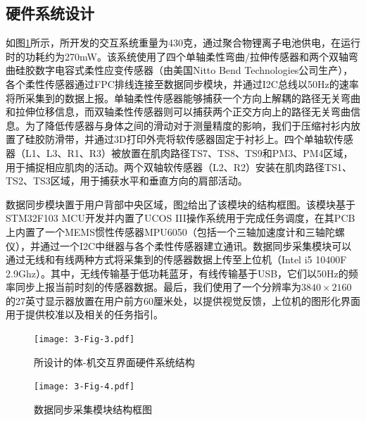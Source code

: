 \subsection{硬件系统设计}如图\ref{3-fig-3}所示，所开发的交互系统重量为430克，通过聚合物锂离子电池供电，在运行时的功耗约为270mW。该系统使用了四个单轴柔性弯曲/拉伸传感器和两个双轴弯曲硅胶数字电容式柔性应变传感器（由美国Nitto Bend Technologies公司生产），各个柔性传感器通过FPC排线连接至数据同步模块，并通过I2C总线以50Hz的速率将所采集到的数据上报。单轴柔性传感器能够捕获一个方向上解耦的路径无关弯曲和拉伸位移信息，而双轴柔性传感器则可以捕获两个正交方向上的路径无关弯曲信息。为了降低传感器与身体之间的滑动对于测量精度的影响，我们于压缩衬衫内放置了硅胶防滑带，并通过3D打印外壳将软传感器固定于衬衫上。四个单轴软传感器（L1、L3、R1、R3）被放置在肌肉路径TS7、TS8、TS9和PM3、PM4区域，用于捕捉相应肌肉的活动。两个双轴软传感器（L2、R2）安装在肌肉路径TS1、TS2、TS3区域，用于捕获水平和垂直方向的肩部活动。

数据同步模块置于用户背部中央区域，图\ref{3-fig-4}给出了该模块的结构框图。该模块基于STM32F103 MCU开发并内置了UCOS III操作系统用于完成任务调度，在其PCB上内置了一个MEMS惯性传感器MPU6050（包括一个三轴加速度计和三轴陀螺仪），并通过一个I2C中继器与各个柔性传感器建立通讯。数据同步采集模块可以通过无线和有线两种方式将采集到的传感器数据上传至上位机（Intel i5 10400F 2.9Ghz）。其中，无线传输基于低功耗蓝牙，有线传输基于USB，它们以50Hz的频率同步上报当前时刻的传感器数据。最后，我们使用了一个分辨率为$3840\times2160$的27英寸显示器放置在用户前方60厘米处，以提供视觉反馈，上位机的图形化界面用于提供校准以及相关的任务指引。  

\begin{figure}[!t]
    \centering
    \texttt{[image: 3-Fig-3.pdf]}
    \caption{所设计的体-机交互界面硬件系统结构}
    \label{3-fig-3}
\end{figure}     

\begin{figure}[!t]
    \centering
    \texttt{[image: 3-Fig-4.pdf]}
    \caption{数据同步采集模块结构框图}
    \label{3-fig-4}
\end{figure} 

